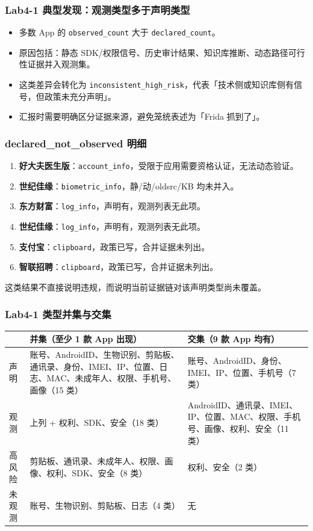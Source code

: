 \documentclass[AutoFakeBold,AutoFakeSlant]{beamer}
\newcommand{\code}[1]{\texttt{#1}}
\begin{document}
\begin{frame}
    \frametitle{Lab4-1 典型发现：观测类型多于声明类型}
    \small
    \begin{itemize}
        \item 多数 App 的 \code{observed\_count} 大于 \code{declared\_count}。
        \item 原因包括：静态 SDK/权限信号、历史审计结果、知识库推断、动态路径可行性证据并入观测集。
        \item 这类差异会转化为 \code{inconsistent\_high\_risk}，代表「技术侧或知识库侧有信号，但政策未充分声明」。
        \item 汇报时需要明确区分证据来源，避免笼统表述为「Frida 抓到了」。
    \end{itemize}
\end{frame}

\begin{frame}
    \frametitle{declared\_not\_observed 明细}
    \scriptsize
    \begin{enumerate}
        \item \textbf{好大夫医生版}：\code{account\_info}，受限于应用需要资格认证，无法动态验证。
        \item \textbf{世纪佳缘}：\code{biometric\_info}，静/动/oldsrc/KB 均未并入。
        \item \textbf{东方财富}：\code{log\_info}，声明有，观测列表无此项。
        \item \textbf{世纪佳缘}：\code{log\_info}，声明有，观测列表无此项。
        \item \textbf{支付宝}：\code{clipboard}，政策已写，合并证据未列出。
        \item \textbf{智联招聘}：\code{clipboard}，政策已写，合并证据未列出。
    \end{enumerate}
    \vspace{0.3em}
    \footnotesize
    这类结果不直接说明违规，而说明当前证据链对该声明类型尚未覆盖。
\end{frame}

\begin{frame}
    \frametitle{Lab4-1 类型并集与交集}
    \tiny
    \begin{tabularx}{\textwidth}{|l|X|X|}
        \hline
        & \textbf{并集（至少 1 款 App 出现）} & \textbf{交集（9 款 App 均有）} \\
        \hline
        声明 & 账号、AndroidID、生物识别、剪贴板、通讯录、身份、IMEI、IP、位置、日志、MAC、未成年人、权限、手机号、画像（15 类） & 账号、AndroidID、身份、IMEI、IP、位置、手机号（7 类） \\
        \hline
        观测 & 上列 + 权利、SDK、安全（18 类） & AndroidID、通讯录、IMEI、IP、位置、MAC、权限、手机号、画像、权利、安全（11 类） \\
        \hline
        高风险 & 剪贴板、通讯录、未成年人、权限、画像、权利、SDK、安全（8 类） & 权利、安全（2 类） \\
        \hline
        未观测 & 账号、生物识别、剪贴板、日志（4 类） & 无 \\
        \hline
    \end{tabularx}
\end{frame}
\end{document}
